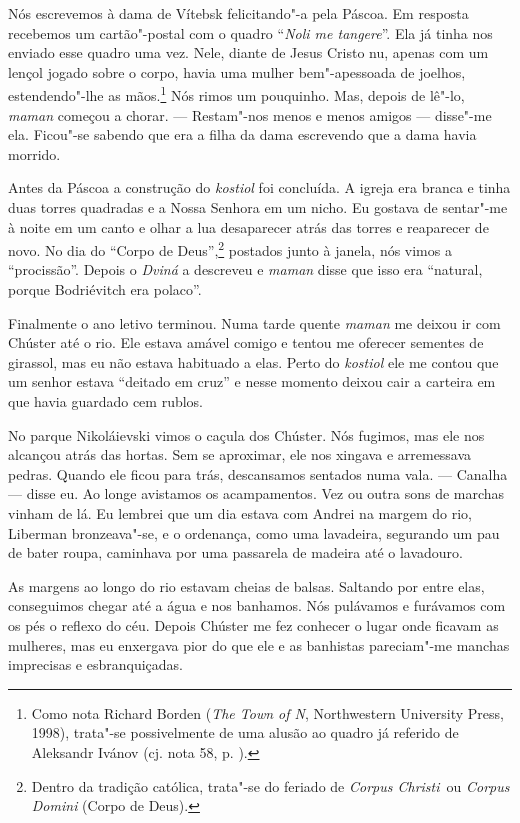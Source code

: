 Nós escrevemos à dama de Vítebsk felicitando"-a pela Páscoa. Em resposta
recebemos um cartão"-postal com o quadro ``\emph{Noli me tangere}''. Ela
já tinha nos enviado esse quadro uma vez. Nele, diante de Jesus Cristo
nu, apenas com um lençol jogado sobre o corpo, havia uma mulher
bem"-apessoada de joelhos, estendendo"-lhe as mãos.\footnote{Como nota
  Richard Borden (\emph{The Town of N}, Northwestern University Press,
  1998), trata"-se possivelmente de uma alusão ao quadro já referido de
  Aleksandr Ivánov (cj. nota 58, p. ).} Nós rimos um pouquinho. Mas,
depois de lê"-lo, \emph{maman} começou a chorar. --- Restam"-nos menos e
menos amigos --- disse"-me ela. Ficou"-se sabendo que era a filha da dama
escrevendo que a dama havia morrido.

Antes da Páscoa a construção do \emph{kostiol} foi concluída. A igreja
era branca e tinha duas torres quadradas e a Nossa Senhora em um nicho.
Eu gostava de sentar"-me à noite em um canto e olhar a lua desaparecer
atrás das torres e reaparecer de novo. No dia do ``Corpo de
Deus'',\footnote{Dentro da tradição católica, trata"-se do feriado de
  \emph{Corpus Christi}~ou \emph{Corpus Domini} (Corpo de Deus).}
postados junto à janela, nós vimos a ``procissão''. Depois o
\emph{Dviná} a descreveu e \emph{maman} disse que isso era ``natural,
porque Bodriévitch era polaco''.

Finalmente o ano letivo terminou. Numa tarde quente \emph{maman} me
deixou ir com Chúster até o rio. Ele estava amável comigo e tentou me
oferecer sementes de girassol, mas eu não estava habituado a elas. Perto
do \emph{kostiol} ele me contou que um senhor estava ``deitado em cruz''
e nesse momento deixou cair a carteira em que havia guardado cem rublos.

No parque Nikoláievski vimos o caçula dos Chúster. Nós fugimos, mas ele
nos alcançou atrás das hortas. Sem se aproximar, ele nos xingava e
arremessava pedras. Quando ele ficou para trás, descansamos sentados
numa vala. --- Canalha --- disse eu. Ao longe avistamos os acampamentos.
Vez ou outra sons de marchas vinham de lá. Eu lembrei que um dia estava
com Andrei na margem do rio, Liberman bronzeava"-se, e o ordenança, como
uma lavadeira, segurando um pau de bater roupa, caminhava por uma
passarela de madeira até o lavadouro.

As margens ao longo do rio estavam cheias de balsas. Saltando por entre
elas, conseguimos chegar até a água e nos banhamos. Nós pulávamos e
furávamos com os pés o reflexo do céu. Depois Chúster me fez conhecer o
lugar onde ficavam as mulheres, mas eu enxergava pior do que ele e as
banhistas pareciam"-me manchas imprecisas e esbranquiçadas.

